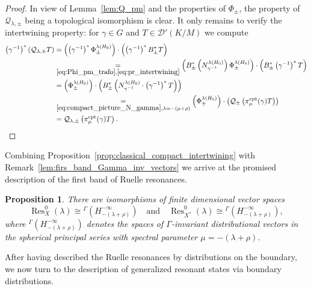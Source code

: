 \documentclass[10pt]{amsart}
\newtheorem{prop}[cdrthm]{Proposition}
\theoremstyle{definition}
\DeclareMathOperator{\Res}{Res}
\DeclareMathOperator{\cpt}{cpt}
\begin{document}
\begin{proof}
In view of Lemma~\ref{lem:Q_pm} and the properties of $\Phi_\pm$, the property of
$\mathcal Q_{\lambda,\pm}$ being a topological isomorphism is clear. It only remains to verify the intertwining property: for $\gamma \in G$ and $T\in\mathcal D'(K/M)$ we compute
\begin{align*}
\left(\gamma^{-1}\right)^*(\mathcal Q_{\lambda,\pm}T) &=\left(\left(\gamma^{-1}\right)^* \Phi_\pm^{\lambda(H_0)}\right)
\cdot\left(\left(\gamma^{-1}\right)^* B_\pm^*T\right)\\
&\underset{\eqref{eq:Phi_pm_trafo},\eqref{eq:pr_intertwining}}{=}
\left(B_\pm^*\left(N_{\gamma^{-1}}^{\lambda(H_0)}\right) \Phi_\pm^{\lambda(H_0)}\right)\cdot
\left(B_\pm^*\left(\gamma^{-1}\right)^*T\right)\\
&=\left(\Phi_\pm^{\lambda(H_0)}\right)\cdot
\left(B_\pm^*\left(N_{\gamma^{-1}}^{\lambda(H_0)}\cdot \left(\gamma^{-1}\right)^* T\right)\right)\\
&\underset{\eqref{eq:compact_picture_N_gamma}, \lambda= -(\mu+\rho)}{=}\left(\Phi_\pm^{\lambda(H_0)}\right)\cdot
\left(\mathcal Q_\pm\left(\pi_\mu^{\cpt}(\gamma) T\right)\right)\\
&= \mathcal Q_{\lambda,\pm}\left(\pi^{\cpt}_\mu(\gamma)T\right).
\end{align*}
\end{proof}


Combining Proposition~\ref{prop:classical_compact_intertwining} with Remark~\ref{lem:firs_band_Gamma_inv_vectors} we arrive at the promised description of the first band of Ruelle resonances.


\begin{prop}\label{prop:ruelle_gamma_inv_distr}
There are isomorphisms of finite dimensional vector spaces
\[
\Res_{X}^0(\lambda) \cong {^\Gamma\left(H_{-(\lambda+\rho)}^{-\infty}\right)}
\quad
\text{and}
\quad
\Res_{X^*}^0(\lambda) \cong {^\Gamma\left(H_{-(\lambda+\rho)}^{-\infty}\right)},
\]
where ${^\Gamma(H_{-(\lambda+\rho)}^{-\infty})}$ denotes the spaces of $\Gamma$-invariant distributional vectors in the spherical principal series with spectral parameter $\mu=-(\lambda+\rho)$.
\end{prop}

After having described the Ruelle resonances by distributions on the boundary, we now turn to the description of generalized resonant states via boundary distributions.
\end{document}

